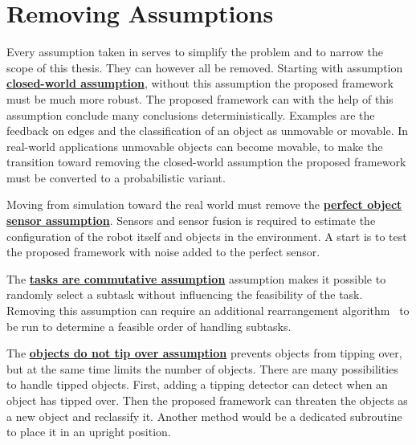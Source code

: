 \section*{Removing Assumptions}
Every assumption taken in  serves to simplify the problem and to narrow the scope of this thesis. They can however all be removed. Starting with assumption \hyperref[assumption:closed_world]{\textbf{closed-world assumption}}, without this assumption the proposed framework must be much more robust. The proposed framework can with the help of this assumption conclude many conclusions deterministically. Examples are the feedback on edges and the classification of an object as unmovable or movable. In real-world applications unmovable objects can become movable, to make the transition toward removing the closed-world assumption the proposed framework must be converted to a probabilistic variant.\bs

Moving from simulation toward the real world must remove the \hyperref[assumption:perfect_object_sensor]{\textbf{perfect object sensor assumption}}. Sensors and sensor fusion is required to estimate the configuration of the robot itself and objects in the environment. A start is to test the proposed framework with noise added to the perfect sensor.\bs

The \hyperref[assumption:order_does_not_matter]{\textbf{tasks are commutative assumption}} assumption makes it possible to randomly select a subtask without influencing the feasibility of the task. Removing this assumption can require an additional rearrangement algorithm~\cite{krontiris_dealing_2015} to be run to determine a feasible order of handling subtasks.\bs

The \hyperref[assumption:no_tipping]{\textbf{objects do not tip over assumption}} prevents objects from tipping over, but at the same time limits the number of objects. There are many possibilities to handle tipped objects. First, adding a tipping detector can detect when an object has tipped over. Then the proposed framework can threaten the objects as a new object and reclassify it. Another method would be a dedicated subroutine to place it in an upright position.\bs
